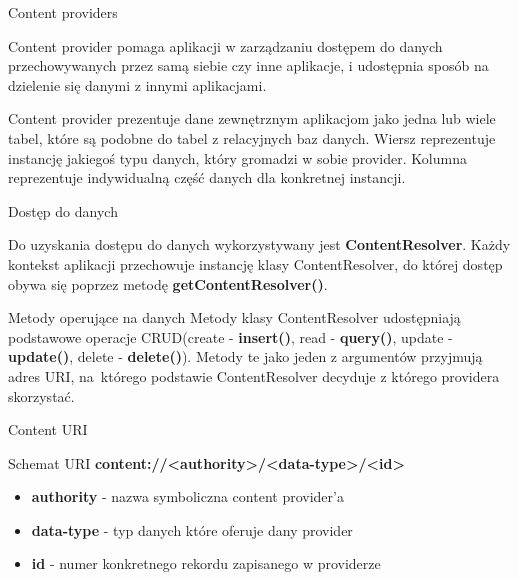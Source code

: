 \documentclass{beamer}
\begin{document}

\begin{frame}{Content providers}
	\begin{block}{}
		Content provider pomaga aplikacji w zarządzaniu dostępem do danych przechowywanych przez samą siebie czy inne aplikacje, i udostępnia sposób na dzielenie się danymi z innymi aplikacjami. 
	\end{block}
	\begin{block}{}
		Content provider prezentuje dane zewnętrznym aplikacjom jako jedna lub wiele tabel, które są podobne do tabel z relacyjnych baz danych. Wiersz reprezentuje instancję jakiegoś typu danych, który gromadzi w sobie provider. Kolumna reprezentuje indywidualną część danych dla konkretnej instancji.
	\end{block}
\end{frame}

\begin{frame}{Dostęp do danych}
	\begin{block}{}
		Do uzyskania dostępu do danych wykorzystywany jest \textbf{ContentResolver}. Każdy kontekst aplikacji przechowuje instancję klasy ContentResolver, do której dostęp obywa się poprzez metodę \textbf{getContentResolver()}. 
	\end{block}
	\begin{block}{Metody operujące na danych}
		Metody klasy ContentResolver udostępniają podstawowe operacje CRUD(create - \textbf{insert()}, read - \textbf{query()}, update - \textbf{update()}, delete - \textbf{delete()}). Metody te jako jeden z argumentów przyjmują adres URI, na~którego podstawie ContentResolver decyduje z którego providera skorzystać.
	\end{block}
\end{frame}

\begin{frame}{Content URI}
	\begin{block}{Schemat URI}
		\textbf{content://<authority>/<data-type>/<id>}
		\begin{itemize}
			\item \textbf{authority} - nazwa symboliczna content provider'a
			\item \textbf{data-type} - typ danych które oferuje dany provider
			\item \textbf{id} - numer konkretnego rekordu zapisanego w providerze
		\end{itemize}
	\end{block}
\end{frame}
\end{document}
